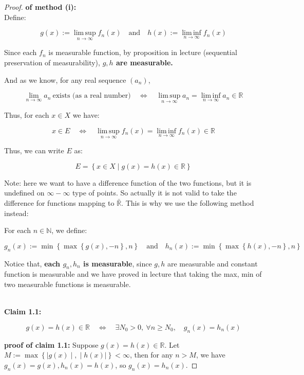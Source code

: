 \begin{proof}

\textbf{of method (i):}\\
Define:

\[g(x) := \operatorname{lim\, sup}\limits_{n\rightarrow\infty}f_{n}(x)\quad\text{and}\quad h(x) := \operatorname{lim\, inf}\limits_{n\rightarrow\infty}f_{n}(x)\]

Since each \(f_{n}\) is measurable function, by proposition in lecture (sequential preservation of measurability), \textbf{\(g,h\) are measurable.}

And as we know, for any real sequence \((a_{n})\),

\[\lim\limits_{n\rightarrow\infty}a_{n}\ \text{exists (as a real number)}\quad\Leftrightarrow\quad\operatorname{lim\, sup}\limits_{n\rightarrow\infty}a_{n} = \operatorname{lim\, inf}\limits_{n\rightarrow\infty}a_{n} \in \mathbb{R}\]

Thus, for each \(x \in X\) we have:

\[x \in E\quad\Leftrightarrow\quad\operatorname{lim\, sup}\limits_{n\rightarrow\infty}f_{n}(x) = \operatorname{lim\, inf}\limits_{n\rightarrow\infty}f_{n}(x) \in \mathbb{R}\]

Thus, we can write \(E\) as:

\[E = \left\{ {x \in X \mid g(x) = h(x) \in \mathbb{R}} \right\}\]

Note: here we want to have a difference function of the two functions, but it is undefined on \(\infty - \infty\) type of points. So actually it is not valid to take the difference for functions mapping to \(\bar{\mathbb{R}}\). This is why we use the following method instead:

For each \(n \in \mathbb{N}\), we define:

\[g_{n}(x) := \min\left\{ {\max\left\{ {g(x), - n} \right\},n} \right\}\quad\text{and}\quad h_{n}(x) := \min\left\{ {\max\left\{ {h(x), - n} \right\},n} \right\}\]

Notice that, \textbf{each \(g_{n},h_{n}\) is measurable}, since \(g,h\) are measurable and constant function is measurable and we have proved in lecture that taking the max, min of two measurable functions is measurable.\\
\strut \\
\textbf{Claim 1.1:}

\[g(x) = h(x) \in \mathbb{R}\quad\Leftrightarrow\quad\exists N_{0} > 0,\ \forall n \geq N_{0},\quad g_{n}(x) = h_{n}(x)\]

\textbf{proof of claim 1.1:} Suppose \(g(x) = h(x) \in \mathbb{R}\). Let \(M := \max\left\{ |g(x) \middle| , \middle| h(x)| \right\} < \infty\), then for any \(n > M\), we have \(g_{n}(x) = g(x),h_{n}(x) = h(x)\), so \(g_{n}(x) = h_{n}(x)\).


\end{proof}
